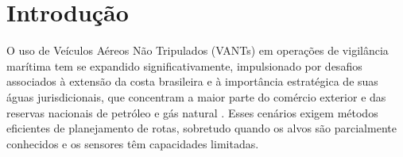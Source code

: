 


\section{Introdução}

O uso de Veículos Aéreos Não Tripulados (VANTs) em operações de vigilância marítima tem se expandido significativamente, impulsionado por desafios associados à extensão da costa brasileira e à importância estratégica de suas águas jurisdicionais, que concentram a maior parte do comércio exterior e das reservas nacionais de petróleo e gás natural \cite{andrade_2021}. Esses cenários exigem métodos eficientes de planejamento de rotas, sobretudo quando os alvos são parcialmente conhecidos e os sensores têm capacidades limitadas.

